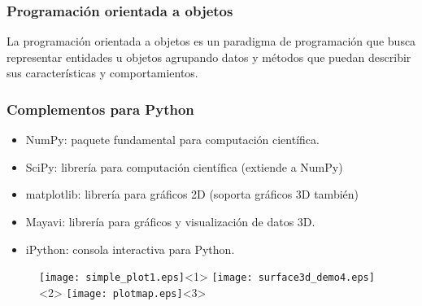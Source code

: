 \documentclass[12pt]{beamer}
\begin{document}
\begin{frame}
\frametitle{Programaci\'{o}n orientada a objetos}
La programaci\'{o}n orientada a objetos es un paradigma de programaci\'{o}n que busca representar entidades u objetos agrupando datos y m\'{e}todos que puedan describir sus caracter\'{i}sticas y comportamientos.
\end{frame}
\begin{frame}
\frametitle{Complementos para Python}
\begin{itemize}
\item NumPy: paquete fundamental para computaci\'{o}n cient\'{i}fica.
\item SciPy: librer\'{i}a para computaci\'{o}n cient\'{i}fica (extiende a NumPy)
\item matplotlib: librer\'{i}a para gr\'{a}ficos 2D (soporta gr\'{a}ficos 3D tambi\'{e}n)
\item Mayavi: librer\'{i}a para gr\'{a}ficos y visualizaci\'{o}n de datos 3D.
\item iPython: consola interactiva para Python.
\end{itemize}
\end{frame}
\begin{frame}
\begin{figure}
	\centering
	\texttt{[image: simple\_plot1.eps]}<1> 
	\texttt{[image: surface3d\_demo4.eps]}<2>
	\texttt{[image: plotmap.eps]}<3>
\end{figure}
\end{frame}
\end{document}
